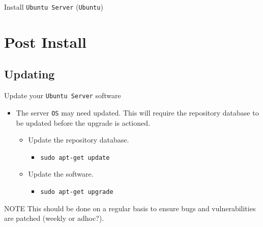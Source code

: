 \documentclass{beamer}
\begin{document}
\begin{frame}{Install \texttt{Ubuntu Server} (\texttt{Ubuntu})}
\begin{figure}
\begin{overprint}
      \centering{}
    \end{overprint}
  \end{figure}
\end{frame}

\section{Post Install}
\subsection{Updating}
\begin{frame}{Update your \texttt{Ubuntu Server} software}
  \begin{itemize}
    \item The server \texttt{OS} may need updated. This will require the repository database to be updated before the upgrade is actioned.
      \begin{itemize}
        \item Update the repository database.
          \begin{itemize}
            \item \texttt{sudo apt-get update}
          \end{itemize}
        \item Update the software.
          \begin{itemize}
            \item \texttt{sudo apt-get upgrade}
          \end{itemize}
      \end{itemize}
  \end{itemize}
  \begin{block}{NOTE}
    This should be done on a regular basis to ensure bugs and vulnerabilities are patched (weekly or adhoc?). 
  \end{block}
\end{frame}
\end{document}
